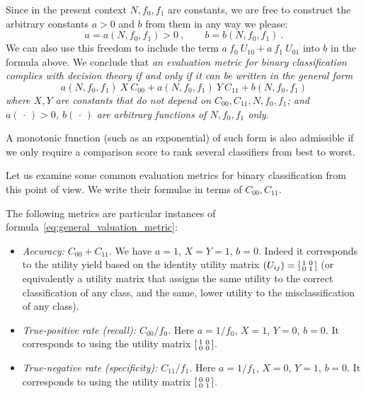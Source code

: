 \documentclass[\ifafour a4paper,12pt,\else a5paper,10pt,\fi%
onecolumn,oneside,article,%
british%
]{memoir}
\theoremstyle{remark}
\theoremstyle{innote}
\newcommand*{\dotv}{\mathord{\,\cdot\,}}%
\renewcommand*{\|}[1][]{\nonscript\:#1\vert\nonscript\:\mathopen{}}
\newcommand*{\itemyes}{{\fontencoding{U}\fontfamily{pzd}\selectfont\symbol{51}}}
\newcommand*{\cx}{X}
\newcommand*{\cy}{Y}
\newcommand*{\sumatrix}[4]{\begin{bsmallmatrix*}[r]#1&#2\\#3&#4\end{bsmallmatrix*}}
\begin{document}
Since in the present context $N, f_{0}, f_{1}$ are constants, we are free to construct the arbitrary constants $a > 0$ and $b$ from them in any way we please:
\begin{equation}
  \label{eq:constants_functions}
  a = a(N, f_{0}, f_{1}) > 0\ , \qquad
  b = b(N, f_{0}, f_{1}) \ .
\end{equation}
We can also use this freedom to include the term $a\ f_{0}\ U_{10} + a\ f_{1}\ U_{01}$ into $b$ in the formula above. We conclude that \emph{an evaluation metric for binary classification complies with decision theory if and only if it can be written in the general form}
\begin{equation}
  \label{eq:general_valuation_metric}
  a(N, f_{0}, f_{1})\ \cx\ C_{00} +
  a(N, f_{0}, f_{1})\ \cy\  C_{11} +
  b(N, f_{0}, f_{1})
\end{equation}
\emph{where $\cx,\cy$ are constants that do not depend on $C_{00}, C_{11}, N, f_{0}, f_{1}$; and $a(\dotv)>0$, $b(\dotv)$ are arbitrary functions of $N, f_{0}, f_{1}$ only.}

A monotonic function (such as an exponential) of such form is also admissible if we only require a comparison score to rank several classifiers from best to worst.

Let us examine some common evaluation metrics for binary classification from this point of view. We write their formulae in terms of $C_{00}, C_{11}$.

The following metrics are particular instances of formula~\eqref{eq:general_valuation_metric}:
\begin{itemize}
\item[\itemyes] \emph{Accuracy:} $C_{00}+C_{11}$. We have $a=1$, $\cx=\cy=1$, $b=0$. Indeed it corresponds to the utility yield based on the identity utility matrix $(U_{ij}) = \sumatrix{ 1}{0}{0}{1 }$ (or equivalently a utility matrix that assigns the same utility to the correct classification of any class, and the same, lower utility to the misclassification of any class).
  
\item[\itemyes] \emph{True-positive rate (recall):} $C_{00}/f_{0}$. Here $a=1/f_{0}$, $\cx=1$, $\cy=0$, $b=0$. It corresponds to using the utility matrix $\sumatrix{ 1}{0}{0}{0 }$. 

\item[\itemyes] \emph{True-negative rate (specificity):} $C_{11}/f_{1}$. Here $a=1/f_{1}$, $\cx=0$, $\cy=1$, $b=0$. It corresponds to using the utility matrix $\sumatrix{ 0}{0}{0}{1 }$. 
\end{itemize}
\end{document}
